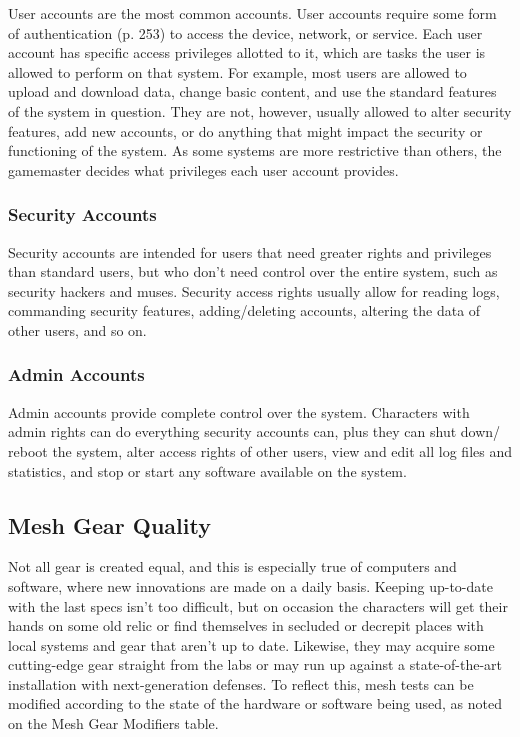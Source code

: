 User accounts are the most common accounts. User accounts require some form of authentication (p. 253) to access the device, network, or service. Each user account has specific access privileges allotted to it, which are tasks the user is allowed to perform on that system. For example, most users are allowed to upload and download data, change basic content, and use the standard features of the system in question. They are not, however, usually allowed to alter security features, add new accounts, or do anything that might impact the security or functioning of the system. As some systems are more restrictive than others, the gamemaster decides what privileges each user account provides. 

\subsubsection{Security Accounts} 

Security accounts are intended for users that need greater rights and privileges than standard users, but who don't need control over the entire system, such as security hackers and muses. Security access rights usually allow for reading logs, commanding security features, adding/deleting accounts, altering the data of other users, and so on. 

\subsubsection{Admin Accounts} 

Admin accounts provide complete control over the system. Characters with admin rights can do everything security accounts can, plus they can shut down/ reboot the system, alter access rights of other users, view and edit all log files and statistics, and stop or start any software available on the system. 

\subsection{Mesh Gear Quality} 

Not all gear is created equal, and this is especially true of computers and software, where new innovations are made on a daily basis. Keeping up-to-date with the last specs isn't too difficult, but on occasion the characters will get their hands on some old relic or find themselves in secluded or decrepit places with local systems and gear that aren't up to date. Likewise, they may acquire some cutting-edge gear straight from the labs or may run up against a state-of-the-art installation with next-generation defenses. To reflect this, mesh tests can be modified according to the state of the hardware or software being used, as noted on the Mesh Gear Modifiers table. 

